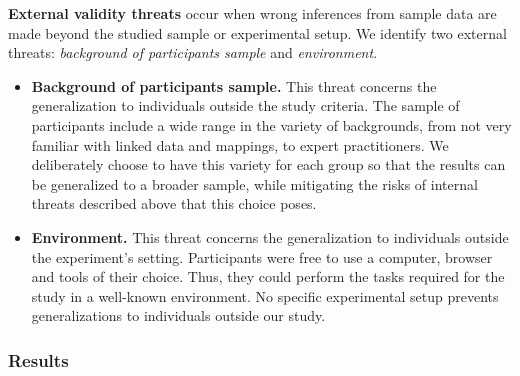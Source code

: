 \textbf{External validity threats} occur when wrong inferences from sample data are made beyond the studied sample or experimental setup. We identify two external threats: \textit{background of participants sample} and \textit{environment}.
\begin{itemize}
    \item \textbf{Background of participants sample.} This threat concerns the generalization to individuals outside the study criteria. The sample of participants include a wide range in the variety of backgrounds, from not very familiar with linked data and mappings, to expert practitioners. We deliberately choose to have this variety for each group so that the results can be generalized to a broader sample, while mitigating the risks of internal threats described above that this choice poses. 
    \item \textbf{Environment.} This threat concerns the generalization to individuals outside the experiment’s setting. Participants were free to use a computer, browser and tools of their choice. Thus, they could perform the tasks required for the study in a well-known environment. No specific experimental setup prevents generalizations to individuals outside our study.
\end{itemize}




\subsubsection{Results}
\label{sec:chp5_mapeathor_results}



